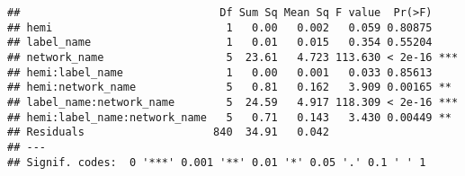 \documentclass[
]{article}
\newenvironment{Shaded}{\begin{snugshade}}{\end{snugshade}}
\newcommand{\CommentTok}[1]{\textcolor[rgb]{0.56,0.35,0.01}{\textit{#1}}}
\newcommand{\DataTypeTok}[1]{\textcolor[rgb]{0.13,0.29,0.53}{#1}}
\newcommand{\KeywordTok}[1]{\textcolor[rgb]{0.13,0.29,0.53}{\textbf{#1}}}
\newcommand{\NormalTok}[1]{#1}
\newcommand{\OperatorTok}[1]{\textcolor[rgb]{0.81,0.36,0.00}{\textbf{#1}}}
\newcommand{\StringTok}[1]{\textcolor[rgb]{0.31,0.60,0.02}{#1}}
\begin{document}
\begin{Shaded}
\end{Shaded}

\begin{verbatim}
##                               Df Sum Sq Mean Sq F value  Pr(>F)    
## hemi                           1   0.00   0.002   0.059 0.80875    
## label_name                     1   0.01   0.015   0.354 0.55204    
## network_name                   5  23.61   4.723 113.630 < 2e-16 ***
## hemi:label_name                1   0.00   0.001   0.033 0.85613    
## hemi:network_name              5   0.81   0.162   3.909 0.00165 ** 
## label_name:network_name        5  24.59   4.917 118.309 < 2e-16 ***
## hemi:label_name:network_name   5   0.71   0.143   3.430 0.00449 ** 
## Residuals                    840  34.91   0.042                    
## ---
## Signif. codes:  0 '***' 0.001 '**' 0.01 '*' 0.05 '.' 0.1 ' ' 1
\end{verbatim}
\end{document}
